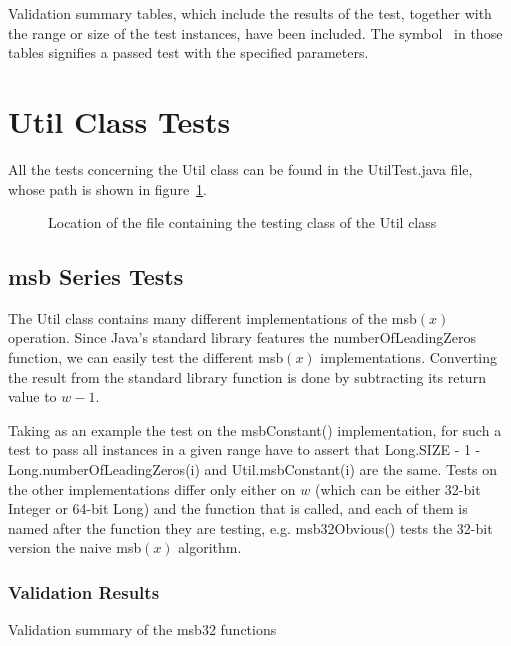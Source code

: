 Validation summary tables, which include the results of the test, together with the range or size of the test instances, have been included.
The symbol \checkmark \ in those tables signifies a passed test with the specified parameters.

\section{{\ttfamily Util} Class Tests}

All the tests concerning the {\ttfamily Util} class can be found in the {\ttfamily UtilTest.java} file, whose path is shown in figure~\ref{fig:utilTestTree}.

\begin{figure}[H]
    \caption{Location of the file containing the testing class of the {\ttfamily Util} class}
    \label{fig:utilTestTree}
\end{figure}

\subsection{msb Series Tests}

The {\ttfamily Util} class contains many different implementations of the msb$(x)$ operation. Since Java's standard library features the {\ttfamily numberOfLeadingZeros} function, we can easily test the different msb$(x)$ implementations. Converting the result from the standard library function is done by subtracting its return value to $w - 1$.

Taking as an example the test on the {\ttfamily msbConstant()} implementation, for such a test to pass all instances in a given range have to assert that {\ttfamily Long.SIZE - 1 - Long.numberOfLeadingZeros(i)} and {\ttfamily Util.msbConstant(i)} are the same. Tests on the other implementations differ only either on $w$ (which can be either 32-bit {\ttfamily Integer} or 64-bit {\ttfamily Long}) and the function that is called, and each of them is named after the function they are testing, e.g. {\ttfamily msb32Obvious()} tests the 32-bit version the naive msb$(x)$ algorithm.

\subsubsection{Validation Results}

\begin{table}[H]
\centering

\caption{Validation summary of the {\ttfamily msb32} functions}
\label{tab:msb32Validation}
\end{table}


